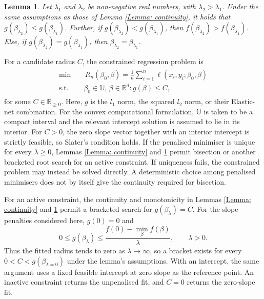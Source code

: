 \documentclass[12pt]{article}
\newcommand{\blue}[1]{\textcolor[rgb]{0.00,0.00,1.00}{#1}}
\newenvironment{bluechange}{\begingroup\color[rgb]{0.00,0.00,1.00}}{\endgroup}
\newtheorem{lemma}{Lemma}
\theoremstyle{remark}
\theoremstyle{plain}
\begin{document}
\begin{lemma}\label{Lemma: monotonicity} Let $\lambda_{1}$ and
$\lambda_{2}$ be non-negative real numbers, with $\lambda_{2}>\lambda_{1}$.
Under the same assumptions as those of Lemma \ref{Lemma: continuity},
it holds that $g(\beta_{\lambda_{2}})\leq g(\beta_{\lambda_{1}})$.
Further, if $g(\beta_{\lambda_{2}})<g(\beta_{\lambda_{1}})$, then
$f(\beta_{\lambda_{2}})>f(\beta_{\lambda_{1}})$. Else, if $g(\beta_{\lambda_{2}})=g(\beta_{\lambda_{1}})$,
then $\beta_{\lambda_{2}}=\beta_{\lambda_{1}}$. \end{lemma}

For a candidate radius $C$, the constrained regression problem is
\begin{align}
\begin{split}\min\quad & \,R_{n}(\beta_{0},\beta)=\frac{1}{n}\sum_{i=1}^{n}\ell(x_{i},y_{i};\beta_{0},\beta)\\
\mathrm{s.t.}\quad & \beta_{0}\in\mathbb{U},\,\beta\in\mathbb{R}^{d}:g(\beta)\leq C,
\end{split}
\label{Eqs: Constrained problem}
\end{align}
for some $C\in\mathbb R_{\geq0}$. Here, $g$ is the $l_1$ norm, the squared $l_2$ norm, or their Elastic-net combination. For the convex computational formulation, $\mathbb U$ is taken to be a compact interval and the relevant intercept solution is assumed to lie in its interior. For $C>0$, the zero slope vector together with an interior intercept is strictly feasible, so Slater's condition holds. If the penalised minimiser is unique for every $\lambda\ge0$, Lemmas \ref{Lemma: continuity} and \ref{Lemma: monotonicity} permit bisection or another bracketed root search for an active constraint. \blue{If uniqueness fails, the constrained problem may instead be solved directly. A deterministic choice among penalised minimisers does not by itself give the continuity required for bisection.}

\begin{bluechange}
For an active constraint, the continuity and monotonicity in Lemmas \ref{Lemma: continuity} and \ref{Lemma: monotonicity} permit a bracketed search for $g(\beta_\lambda)=C$. For the slope penalties considered here, $g(0)=0$ and
\[
0\le g(\beta_\lambda)
\le \frac{f(0)-\min_\beta f(\beta)}{\lambda},\qquad \lambda>0.
\]
Thus the fitted radius tends to zero as $\lambda\to\infty$, so a bracket exists for every $0<C<g(\beta_{\lambda=0})$ under the lemma's assumptions. With an intercept, the same argument uses a fixed feasible intercept at zero slope as the reference point. An inactive constraint returns the unpenalised fit, and $C=0$ returns the zero-slope fit.
\end{bluechange}
\end{document}
